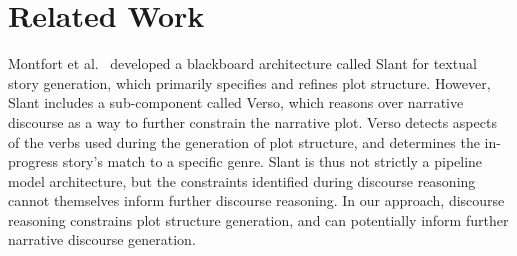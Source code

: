 \section{Related Work}



Montfort et al.~\cite{montfort2013slant} developed a blackboard
architecture called Slant for textual story generation, which primarily
specifies and refines plot structure. However, Slant
includes a sub-component called Verso, which reasons over narrative 
discourse as a way to further constrain the narrative plot. Verso 
detects aspects of the verbs used during the generation of plot structure, 
and determines the in-progress story's match to a specific genre.
Slant is thus not strictly a pipeline model architecture, but the constraints 
identified during discourse reasoning cannot themselves inform further 
discourse reasoning. In our approach, discourse reasoning constrains plot structure
generation, and can potentially inform further narrative discourse generation.

